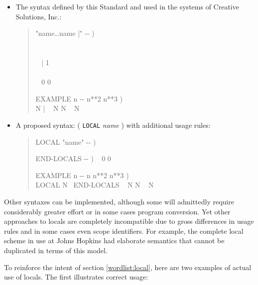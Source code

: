 \begin{itemize}
\item The syntax defined by this Standard and used in the systems of
	Creative Solutions, Inc.:

	\begin{quote}\ttfamily
	\word{:}   "name{\ldots}name |" -{}- ) \\
	\tab {} \\
	\tab~   ~    \\
	\tab~ \word{[CHAR]} | \word{-}  1 \word{-}  ~  \\
	\tab~  \\
	\tab {}  ~ 0 0  \\
	\word{;} 

	\word{:} EXAMPLE  n -{}- n**2 n**3 ) \\
	\tab {} N |
		~ N  N \word{*} ~ N \word{*}
	\word{;}
	\end{quote}

\item A proposed syntax: ( \texttt{LOCAL} \emph{name} ) with
	additional usage rules:

	\begin{quote}\ttfamily
	\word{:} LOCAL  "name" -{}- )
		   
	\word{;} ~

	\word{:} END-LOCALS  -{}- ) ~ 0 0 
	\word{;} ~

	\word{:} EXAMPLE  n -{}- n n**2 n**3 ) \\
	\tab LOCAL N ~END-LOCALS ~
		N  N \word{*} ~  N \word{*}
	\word{;}
	\end{quote}
\end{itemize}

Other syntaxes can be implemented, although some will admittedly
require considerably greater effort or in some cases program
conversion. Yet other approaches to locals are completely incompatible
due to gross differences in usage rules and in some cases even scope
identifiers. For example, the complete local scheme in use at Johns
Hopkins had elaborate semantics that cannot be duplicated in terms of
this model.

To reinforce the intent of section \ref{wordlist:local}, here are
two examples of actual use of locals. The first illustrates correct
usage:

